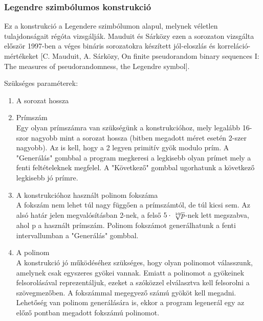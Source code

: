 \documentclass[12pt]{article}
\begin{document}
	\subsubsection{Legendre szimbólumos konstrukció}
		Ez a konstrukció a Legendere szimbólumon alapul, melynek véletlen tulajdonságait régóta vizsgálják. Mauduit és Sárközy ezen a sorozaton vizsgálta először 1997-ben a véges bináris sorozatokra készített jól-eloszlás és korreláció-mértékeket [C. Mauduit, A. Sárközy, On finite pseudorandom binary sequences I: The measures of pseudorandomness, the Legendre symbol].
	\par
	Szükséges paraméterek:
	\begin{enumerate}\bfseries
		\item A sorozat hossza
		\\ 
		\bfseries \item Prímszám
		\\ \normalfont Egy olyan prímszámra van szükségünk a konstrukcióhoz, mely legalább 16-szor nagyobb mint a sorozat hossza (bitben megadott méret esetén 2-szer nagyobb). Az is kell, hogy a 2 legyen primitív gyök modulo prím. A "Generálás" gombbal a program megkeresi a legkisebb olyan prímet mely a fenti feltételeknek megfelel. A "Következő" gombbal ugorhatunk a következő legkisebb jó prímre.
		\bfseries \item A konstrukcióhoz használt polinom fokszáma \\ \normalfont
		A fokszám nem lehet túl nagy függően a prímszámtól, de túl kicsi sem. Az alsó határ jelen megvalósításban 2-nek, a felső $5\cdot\sqrt[\leftroot{-2}\uproot{2}10]{p}$-nek lett megszabva, ahol p a használt prímszám. Polinom fokszámot generálhatunk a fenti intervallumban a "Generálás" gombbal.
		\bfseries \item A polinom \\
		\normalfont
		A konstrukció jó működéséhez szükséges, hogy olyan polinomot válasszunk, amelynek csak egyszeres gyökei vannak. Emiatt a polinomot a gyökeinek felsorolásával reprezentáljuk, ezeket a szóközzel elválasztva kell felsorolni a szövegmezőben. A fokszámmal megegyező számú gyököt kell megadni. Lehetőség van polinom generálására is, ekkor a program legenerál egy az előző pontban megadott fokszámú polinomot.
	\end{enumerate}
	
\end{document}
